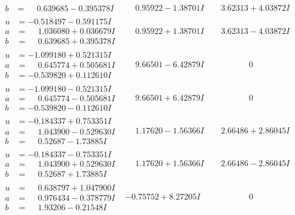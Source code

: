 \documentclass[1p]{elsarticle_modified}
\theoremstyle{definition}
\begin{document}
$$\begin{array}{c|c|c}
\begin{aligned}
b &= \phantom{-}0.639685 - 0.395378 I\end{aligned}
 & \phantom{-}0.95922 - 1.38701 I & \phantom{-}3.62313 + 4.03872 I \\ \hline\begin{aligned}
u &= -0.518497 - 0.591175 I \\
a &= \phantom{-}1.036080 + 0.036679 I \\
b &= \phantom{-}0.639685 + 0.395378 I\end{aligned}
 & \phantom{-}0.95922 + 1.38701 I & \phantom{-}3.62313 - 4.03872 I \\ \hline\begin{aligned}
u &= -1.099180 + 0.521315 I \\
a &= \phantom{-}0.645774 + 0.505681 I \\
b &= -0.539820 + 0.112610 I\end{aligned}
 & \phantom{-}9.66501 - 6.42879 I & \phantom{-0.000000 } 0 \\ \hline\begin{aligned}
u &= -1.099180 - 0.521315 I \\
a &= \phantom{-}0.645774 - 0.505681 I \\
b &= -0.539820 - 0.112610 I\end{aligned}
 & \phantom{-}9.66501 + 6.42879 I & \phantom{-0.000000 } 0 \\ \hline\begin{aligned}
u &= -0.184337 + 0.753351 I \\
a &= \phantom{-}1.043900 - 0.529630 I \\
b &= \phantom{-}0.52687 - 1.73885 I\end{aligned}
 & \phantom{-}1.17620 - 1.56366 I & \phantom{-}2.66486 + 2.86045 I \\ \hline\begin{aligned}
u &= -0.184337 - 0.753351 I \\
a &= \phantom{-}1.043900 + 0.529630 I \\
b &= \phantom{-}0.52687 + 1.73885 I\end{aligned}
 & \phantom{-}1.17620 + 1.56366 I & \phantom{-}2.66486 - 2.86045 I \\ \hline\begin{aligned}
u &= \phantom{-}0.638797 + 1.047900 I \\
a &= \phantom{-}0.976434 - 0.378779 I \\
b &= \phantom{-}1.93206 - 0.21548 I\end{aligned}
 & -0.75752 + 8.27205 I & \phantom{-0.000000 } 0 \\ \hline\begin{aligned}

\end{aligned}
\end{array}$$
\end{document}
